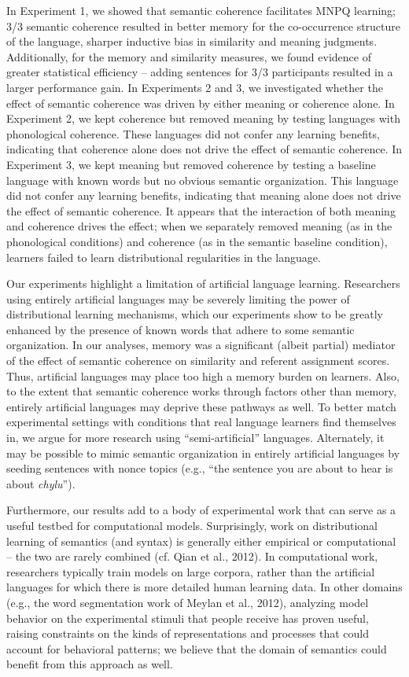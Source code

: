 \documentclass[man,floatsintext]{apa6}
\begin{document}
In Experiment 1, we showed that semantic coherence facilitates MNPQ learning; 3/3 semantic coherence resulted in better memory for the co-occurrence structure of the language, sharper inductive bias in similarity and meaning judgments. Additionally, for the memory and similarity measures, we found evidence of greater statistical efficiency -- adding sentences for 3/3 participants resulted in a larger performance gain. In Experiments 2 and 3, we investigated whether the effect of semantic coherence was driven by either meaning or coherence alone. In Experiment 2, we kept coherence but removed meaning by testing languages with phonological coherence. These languages did not confer any learning benefits, indicating that coherence alone does not drive the effect of semantic coherence. In Experiment 3, we kept meaning but removed coherence by testing a baseline language with known words but no obvious semantic organization. This language did not confer any learning benefits, indicating that meaning alone does not drive the effect of semantic coherence. It appears that the interaction of both meaning and coherence drives the effect; when we separately removed meaning (as in the phonological conditions) and coherence (as in the semantic baseline condition), learners failed to learn distributional regularities in the language.

Our experiments highlight a limitation of artificial language learning. Researchers using entirely artificial languages may be severely limiting the power of distributional learning mechanisms, which our experiments show to be greatly enhanced by the presence of known words that adhere to some semantic organization. In our analyses, memory was a significant (albeit partial) mediator of the effect of semantic coherence on similarity and referent assignment scores. Thus, artificial languages may place too high a memory burden on learners. Also, to the extent that semantic coherence works through factors other than memory, entirely artificial languages may deprive these pathways as well. To better match experimental settings with conditions that real language learners find themselves in, we argue for more research using ``semi-artificial'' languages. Alternately, it may be possible to mimic semantic organization in entirely artificial languages by seeding sentences with nonce topics (e.g., ``the sentence you are about to hear is about \emph{chylu}'').

Furthermore, our results add to a body of experimental work that can serve as a useful testbed for computational models. Surprisingly, work on distributional learning of semantics (and syntax) is generally either empirical or computational -- the two are rarely combined (cf. Qian et al., 2012).  In computational work, researchers typically train models on large corpora, rather than the artificial languages for which there is more detailed human learning data. In other domains (e.g., the word segmentation work of Meylan et al., 2012), analyzing model behavior on the experimental stimuli that people receive has proven useful, raising constraints on the kinds of representations and processes that could account for behavioral patterns; we believe that the domain of semantics could benefit from this approach as well.
\end{document}

